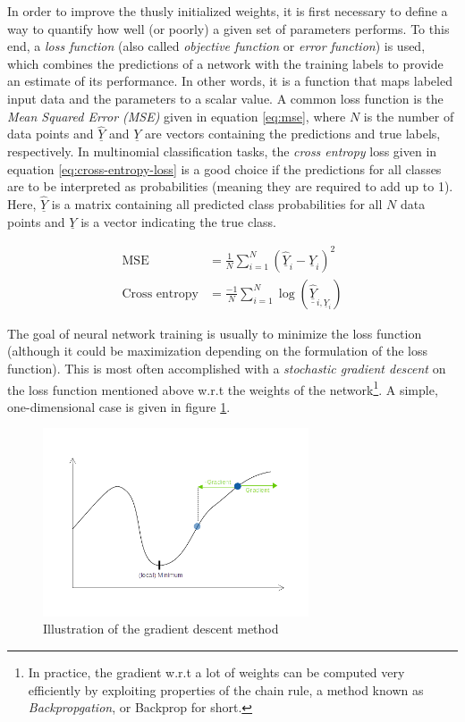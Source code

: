 \documentclass[11pt, a4paper]{article}
\newcommand\braces[1]{\left(#1\right)}
\renewcommand{\vec}[1]{\underline{#1}}
\newcommand{\mat}[1]{\underline{\underline{#1}}}
\begin{document}
In order to improve the thusly initialized weights, it is first necessary to define a way to quantify how well (or poorly) a given set of parameters performs. To this end, a \emph{loss function} (also called \emph{objective function} or \emph{error function}) is used, which combines the predictions of a network with the training labels to provide an estimate of its performance. In other words, it is a function that maps labeled input data and the parameters to a scalar value. A common loss function is the \emph{Mean Squared Error (MSE)} given in equation \eqref{eq:mse}, where $N$ is the number of data points and $\vec{\hat Y}$ and $\vec{Y}$ are vectors containing the predictions and true labels, respectively. In multinomial classification tasks, the \emph{cross entropy} loss given in equation \eqref{eq:cross-entropy-loss} \cite{caffe-cross-entropy} is a good choice if the predictions for all classes are to be interpreted as probabilities (meaning they are required to add up to 1). Here, $\vec{\hat Y}$ is a matrix containing all predicted class probabilities for all $N$ data points and $\vec{Y}$ is a vector indicating the true class.

\begin{align}
	\text{MSE} &= \frac{1}{N} \sum_{i=1}^N \braces{\vec{\hat Y}_i - \vec{Y}_i}^2 \label{eq:mse} \\
	\text{Cross entropy} &= \frac{-1}{N} \sum_{i=1}^N \log{\braces{\mat{\hat Y}_{i, \vec{Y}_i}}} \label{eq:cross-entropy-loss}
\end{align}

The goal of neural network training is usually to minimize the loss function (although it could be maximization depending on the formulation of the loss function). This is most often accomplished with a \emph{stochastic gradient descent} on the loss function mentioned above w.r.t the weights of the network\footnote{In practice, the gradient w.r.t a lot of weights can be computed very efficiently by exploiting properties of the chain rule, a method known as \emph{Backpropgation}, or Backprop for short.}. A simple, one-dimensional case is given in figure \ref{fig:gradient-descent}.

\begin{figure}[htp]
	\centering
	\includegraphics[width=0.7\textwidth]{images/gradient_descent.png}
	\caption{Illustration of the gradient descent method}
	\label{fig:gradient-descent}
\end{figure}
\end{document}
